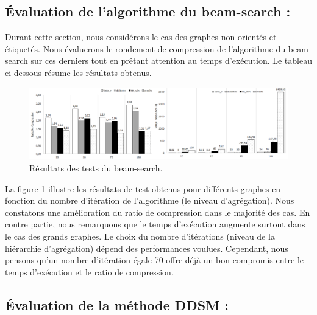 	
	
	
	\subsection{Évaluation de l'algorithme du beam-search :}
	
  Durant cette section, nous considérons le cas des graphes non orientés et étiquetés. Nous évaluerons le rondement de compression de l'algorithme du beam-search sur ces derniers tout en prêtant attention au temps d'exécution. Le tableau ci-dessous résume les résultats obtenus.
  

	\begin{figure}[H]
	
			
			\includegraphics[scale=0.37]{ressources/image/beam.png}
			
			\caption{Résultats des tests du beam-search.}
			\label{fig:test-beam}
	
	\end{figure}
	
	
	  La figure \ref{fig:test-beam} illustre les résultats de test obtenus pour différents graphes en fonction du nombre d'itération de l'algorithme (le niveau d'agrégation). Nous constatons une amélioration du ratio de compression dans le majorité des cas. En contre partie, nous remarquons que le temps d'exécution  augmente surtout dans le cas des grands graphes. Le choix du nombre d'itérations (niveau de la hiérarchie d'agrégation) dépend des performances voulues. Cependant, nous pensons qu'un  nombre d'itération égale 70 offre déjà un bon compromis entre le temps d'exécution et le ratio de compression.
	
	
	\subsection{Évaluation de la méthode DDSM :}
	
